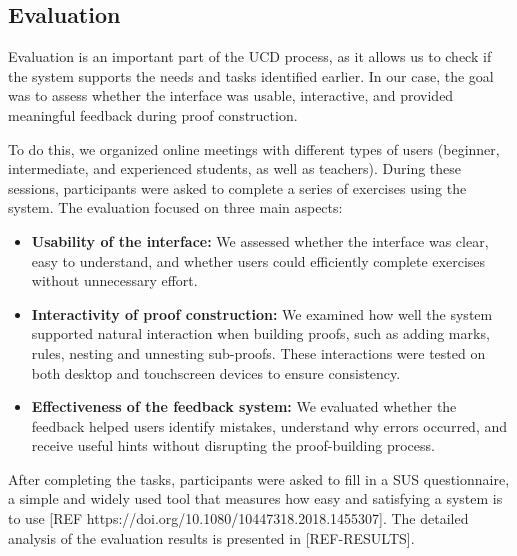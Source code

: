 \subsection{Evaluation}
Evaluation is an important part of the \gls{UCD} process, as it allows us to check if the system supports the needs and tasks identified earlier. In our case, the goal was to assess whether the interface was usable, interactive, and provided meaningful feedback during proof construction.

To do this, we organized online meetings with different types of users (beginner, intermediate, and experienced students, as well as teachers). During these sessions, participants were asked to complete a series of exercises using the system. The evaluation focused on three main aspects:

\begin{itemize}
    \item \textbf{Usability of the interface:} We assessed whether the interface was clear, easy to understand, and whether users could efficiently complete exercises without unnecessary effort.
    \item \textbf{Interactivity of proof construction:} We examined how well the system supported natural interaction when building proofs, such as adding marks, rules, nesting and unnesting sub-proofs. These interactions were tested on both desktop and touchscreen devices to ensure consistency.
    \item \textbf{Effectiveness of the feedback system:} We evaluated whether the feedback helped users identify mistakes, understand why errors occurred, and receive useful hints without disrupting the proof-building process.
\end{itemize}

After completing the tasks, participants were asked to fill in a \gls{SUS} questionnaire, a simple and widely used tool that measures how easy and satisfying a system is to use [REF https://doi.org/10.1080/10447318.2018.1455307]. The detailed analysis of the evaluation results is presented in [REF-RESULTS].

